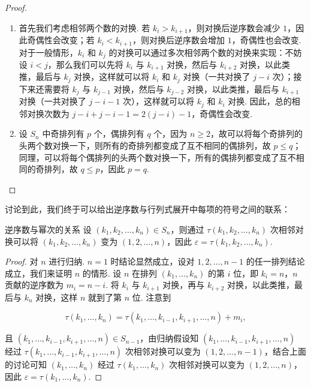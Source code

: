\begin{proof}
    \begin{enumerate}
        \item 首先我们考虑相邻两个数的对换. 若 $k_i > k_{i+1}$，则对换后逆序数会减少 $1$，因此奇偶性会改变；若 $k_i < k_{i+1}$，则对换后逆序数会增加 $1$，奇偶性也会改变. 对于一般情形，$k_i$ 和 $k_j$ 的对换可以通过多次相邻两个数的对换来实现：不妨设 $i < j$，那么我们可以先将 $k_i$ 与 $k_{i+1}$ 对换，然后与 $k_{i+2}$ 对换，以此类推，最后与 $k_j$ 对换，这样就可以将 $k_i$ 和 $k_j$ 对换（一共对换了 $j-i$ 次）；接下来还需要将 $k_j$ 与 $k_{j-1}$ 对换，然后与 $k_{j-2}$ 对换，以此类推，最后与 $k_{i+1}$ 对换（一共对换了 $j-i-1$ 次），这样就可以将 $k_j$ 和 $k_i$ 对换. 因此，总的相邻对换次数为 $j-i+j-i-1=2(j-i)-1$，奇偶性会改变.
        \item 设 $S_n$ 中奇排列有 $p$ 个，偶排列有 $q$ 个，因为 $n \geqslant 2$，故可以将每个奇排列的头两个数对换一下，则所有的奇排列都变成了互不相同的偶排列，故 $p \leqslant q$；同理，可以将每个偶排列的头两个数对换一下，所有的偶排列都变成了互不相同的奇排列，故 $q \leqslant p$，因此 $p = q$.
    \end{enumerate}
\end{proof}

讨论到此，我们终于可以给出逆序数与行列式展开中每项的符号之间的联系：

\begin{theorem}{}{逆序数与幂次的关系}
    设 $(k_1,k_2,\ldots,k_n) \in S_n$，则通过 $\tau(k_1,k_2,\ldots,k_n)$ 次相邻对换可以将 $(k_1,k_2,\ldots,k_n)$ 变为 $(1,2,\ldots,n)$，因此 $\varepsilon = \tau(k_1,k_2,\ldots,k_n)$.
\end{theorem}

\begin{proof}
    对 $n$ 进行归纳. $n=1$ 时结论显然成立，设对 $1,2,\ldots,n-1$ 的任一排列结论成立，我们来证明 $n$ 的情形. 设 $n$ 在排列 $(k_1,\ldots,k_n)$ 的第 $i$ 位，即 $k_i = n$，$n$ 贡献的逆序数为 $m_i = n - i$. 将 $k_i$ 与 $k_{i+1}$ 对换，再与 $k_{i+2}$ 对换，以此类推，最后与 $k_n$ 对换，这样 $n$ 就到了第 $n$ 位. 注意到

    \[ \tau(k_1,\ldots,k_n) = \tau(k_1,\ldots,k_{i-1},k_{i+1},\ldots,n) + m_i,\]

    且 $(k_1,\ldots,k_{i-1},k_{i+1},\ldots,n) \in S_{n-1}$，由归纳假设知 $(k_1,\ldots,k_{i-1},k_{i+1},\ldots,n)$ 经过 $\tau(k_1,\ldots,k_{i-1},k_{i+1},\ldots,n)$ 次相邻对换可以变为 $(1,2,\ldots,n-1)$，结合上面的讨论可知 $(k_1,\ldots,k_n)$ 经过 $\tau(k_1,\ldots,k_n)$ 次相邻对换可以变为 $(1,2,\ldots,n)$，因此 $\varepsilon = \tau(k_1,\ldots,k_n)$.
\end{proof}


